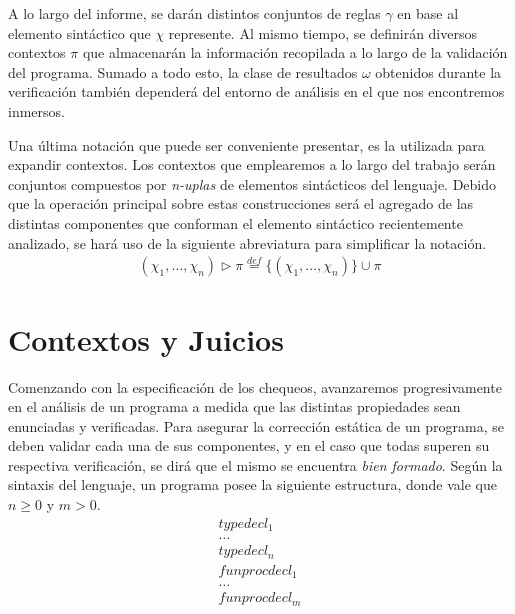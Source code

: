 A lo largo del informe, se darán distintos conjuntos de reglas $\gamma$ en base al elemento sintáctico que $\chi$ represente.
Al mismo tiempo, se definirán diversos contextos $\pi$ que almacenarán la información recopilada a lo largo de la validación del programa.
Sumado a todo esto, la clase de resultados $\omega$ obtenidos durante la verificación también dependerá del entorno de análisis en el que nos encontremos inmersos.

Una última notación que puede ser conveniente presentar, es la utilizada para expandir contextos.
Los contextos que emplearemos a lo largo del trabajo serán conjuntos compuestos por \textit{n-uplas} de elementos sintácticos del lenguaje.
Debido que la operación principal sobre estas construcciones será el agregado de las distintas componentes que conforman el elemento sintáctico recientemente analizado, se hará uso de la siguiente abreviatura para simplificar la notación.
\begin{gather*}
(\chi_1, \ldots, \chi_n) \triangleright \pi \overset{def}{=} \{ (\chi_1, \ldots, \chi_n) \} \cup \pi
\end{gather*}

\section{Contextos y Juicios}

Comenzando con la especificación de los chequeos, avanzaremos progresivamente en el análisis de un programa a medida que las distintas propiedades sean enunciadas y verificadas.
Para asegurar la corrección estática de un programa, se deben validar cada una de sus componentes, y en el caso que todas superen su respectiva verificación, se dirá que el mismo se encuentra \textit{bien formado}.
Según la sintaxis del lenguaje, un programa posee la siguiente estructura, donde vale que $n \geq 0$ y $m > 0$.
\begin{gather*}
typedecl_1 \\
\ldots \\
typedecl_n \\
funprocdecl_1 \\
\ldots \\
funprocdecl_m
\end{gather*}